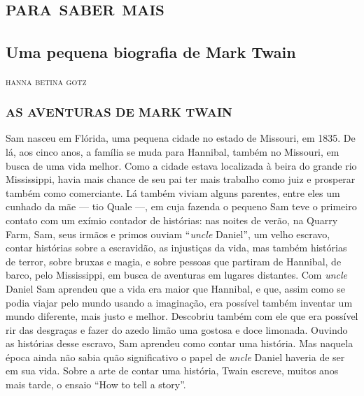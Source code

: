 \part{\textsc{para saber mais}}

\chapter{Uma pequena biografia de Mark Twain}

\begin{flushright}
\textsc{hanna betina gotz}
\end{flushright}
\medskip

\section{AS AVENTURAS DE MARK TWAIN}

\noindent{}Sam nasceu em Flórida, uma pequena cidade no estado de Missouri, em
1835. De lá, aos cinco anos, a família se muda para Hannibal, também no
Missouri, em busca de uma vida melhor. Como a cidade estava
localizada à beira do grande rio Mississippi, havia mais chance de seu pai ter
mais trabalho como juiz e prosperar também como comerciante.
Lá também viviam alguns parentes, entre eles um cunhado da mãe --- 
tio Quale ---, em cuja fazenda o pequeno Sam teve o primeiro contato com
um exímio contador de histórias: nas noites de verão, na
Quarry Farm, Sam, seus irmãos e primos ouviam ``\textit{uncle}
Daniel'', um velho escravo, contar histórias sobre a
escravidão, as injustiças da vida, mas também histórias de terror, sobre
bruxas e magia, e sobre pessoas que partiram de Hannibal, de barco, pelo
Mississippi, em busca de aventuras em lugares distantes. Com \textit{uncle} Daniel
Sam aprendeu que a vida era maior que Hannibal, e que, assim como se podia
viajar pelo mundo usando a imaginação, era possível também inventar um mundo
diferente, mais justo e melhor. Descobriu também com ele que era
possível rir das desgraças e fazer do azedo limão uma gostosa e doce
limonada. Ouvindo as histórias desse escravo, Sam aprendeu como
contar uma história. Mas naquela época ainda não sabia quão
significativo o papel de \textit{uncle} Daniel haveria de ser em sua vida. Sobre a
arte de contar uma história, Twain escreve, muitos anos mais tarde, o
ensaio ``How to tell a story''.

